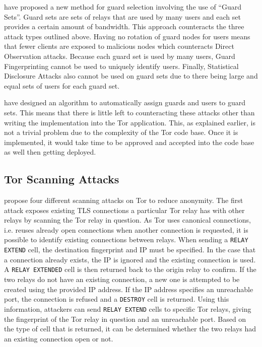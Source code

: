 \documentclass[9pt,technote]{IEEEtran}
\begin{document}
\citeauthor{hayesguard} have proposed a new method for guard selection involving the use of ``Guard Sets''. Guard sets are sets of relays that are used by many users and each set provides a certain amount of bandwidth. This approach counteracts the three attack types outlined above. Having no rotation of guard nodes for users means that fewer clients are exposed to malicious nodes which counteracts Direct Observation attacks. Because each guard set is used by many users, Guard Fingerprinting cannot be used to uniquely identify users. Finally, Statistical Disclosure Attacks also cannot be used on guard sets due to there being large and equal sets of users for each guard set.

\citeauthor{hayesguard} have designed an algorithm to automatically assign guards and users to guard sets. This means that there is little left to counteracting these attacks other than writing the implementation into the Tor application. This, as explained earlier, is not a trivial problem due to the complexity of the Tor code base. Once it is implemented, it would take time to be approved and accepted into the code base as well then getting deployed.

\subsection{Tor Scanning Attacks}
\citeauthor{biryukov2012torscan} propose four different scanning attacks on Tor to reduce anonymity. The first attack exposes existing TLS connections a particular Tor relay has with other relays by scanning the Tor relay in question. As Tor uses canonical connections, i.e. reuses already open connections when another connection is requested, it is possible to identify existing connections between relays. When sending a \texttt{RELAY EXTEND} cell, the destination fingerprint and IP must be specified. In the case that a connection already exists, the IP is ignored and the existing connection is used. A \texttt{RELAY EXTENDED} cell is then returned back to the origin relay to confirm. If the two relays do not have an existing connection, a new one is attempted to be created using the provided IP address. If the IP address specifies an unreachable port, the connection is refused and a \texttt{DESTROY} cell is returned. Using this information, attackers can send \texttt{RELAY EXTEND} cells to specific Tor relays, giving the fingerprint of the Tor relay in question and an unreachable port. Based on the type of cell that is returned, it can be determined whether the two relays had an existing connection open or not.
\end{document}
